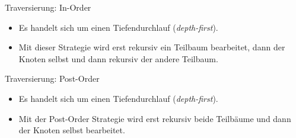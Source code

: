 \begin{frame}{Traversierung: In-Order}
    \begin{itemize}[<+(1)->]
        \item Es handelt sich um einen Tiefendurchlauf (\textit{depth-first}).
        \item Mit dieser Strategie wird erst rekursiv ein Teilbaum bearbeitet, dann der Knoten selbst und dann rekursiv der andere Teilbaum.\pause{}
    \end{itemize}\medskip
    \pause{}\begin{center}
    \end{center}
\end{frame}

\begin{frame}{Traversierung: Post-Order}
    \begin{itemize}[<+(1)->]
        \item Es handelt sich um einen Tiefendurchlauf (\textit{depth-first}).
        \item Mit der Post-Order Strategie wird erst rekursiv beide Teilbäume und dann der Knoten selbst bearbeitet.
    \end{itemize}\medskip
    \pause{}\begin{center}
    \end{center}
\end{frame}

